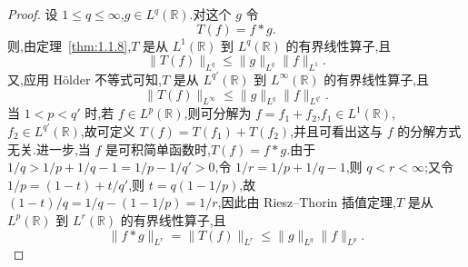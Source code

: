 \begin{proof}
设 $1 \leq q \leq \infty$,$g \in L^{q}(\mathbb{R})$.对这个 $g$ 令
\begin{equation*}
T(f) = f * g.
\end{equation*}
则,由定理~\ref{thm:1.1.8},$T$ 是从 $L^{1}(\mathbb{R})$ 到 $L^{q}(\mathbb{R})$ 的有界线性算子,且
\begin{equation*}
\| T(f) \|_{L^{q}} \leq \| g \|_{L^{q}}\| f \|_{L^{1}}.
\end{equation*}
又,应用 Hölder 不等式可知,$T$ 是从 $L^{q'}(\mathbb{R})$ 到 $L^{\infty}(\mathbb{R})$ 的有界线性算子,且
\begin{equation*}
\| T(f) \|_{L^{\infty}} \leq \| g \|_{L^{q}}\| f \|_{L^{q'}}.
\end{equation*}
当 $1 < p < q'$ 时,若 $f \in L^{p}(\mathbb{R})$,则可分解为 $f = f_{1} + f_{2}$,$f_{1} \in L^{1}(\mathbb{R})$,$f_{2} \in L^{q'}(\mathbb{R})$,故可定义 $T(f) = T(f_{1}) + T(f_{2})$,并且可看出这与 $f$ 的分解方式无关.进一步,当 $f$ 是可积简单函数时,$T(f) = f * g$.由于 $1/q > 1/p + 1/q - 1 = 1/p - 1/q' > 0$,令 $1/r = 1/p + 1/q - 1$,则 $q < r < \infty$;又令 $1/p = (1 - t) + t/q'$,则 $t = q(1 - 1/p)$,故 $(1 - t)/q = 1/q - (1 - 1/p) = 1/r$,因此由 Riesz--Thorin 插值定理,$T$ 是从 $L^{p}(\mathbb{R})$ 到 $L^{r}(\mathbb{R})$ 的有界线性算子,且
\begin{equation*}
\| f * g \|_{L^{r}} = \| T(f) \|_{L^{r}} \leq \| g \|_{L^{q}}\| f \|_{L^{p}}.
\end{equation*}
\end{proof}
